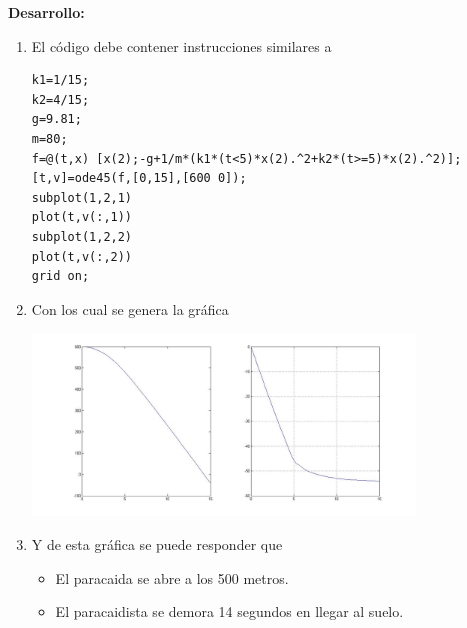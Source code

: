 \documentclass[11pt]{article}
\begin{document}
\begin{enumerate}
\newpage 
\textbf{Desarrollo:}
\begin{enumerate}
\item El c\'odigo debe contener instrucciones similares a
\begin{lstlisting}
k1=1/15;
k2=4/15;
g=9.81;
m=80;
f=@(t,x) [x(2);-g+1/m*(k1*(t<5)*x(2).^2+k2*(t>=5)*x(2).^2)];
[t,v]=ode45(f,[0,15],[600 0]);
subplot(1,2,1)
plot(t,v(:,1))
subplot(1,2,2)
plot(t,v(:,2))
grid on;
\end{lstlisting}
\item Con los cual se genera la gr\'afica 
\begin{center}
\includegraphics[width=0.8\textwidth]{./paracaidista.jpg}
\end{center}
\item Y de esta gr\'afica se puede responder que 
\begin{itemize}
\item El paracaida se abre a los 500 metros.
\item El paracaidista se demora 14 segundos en llegar al suelo.
\end{itemize}
\end{enumerate}
\end{enumerate}
\end{document}
